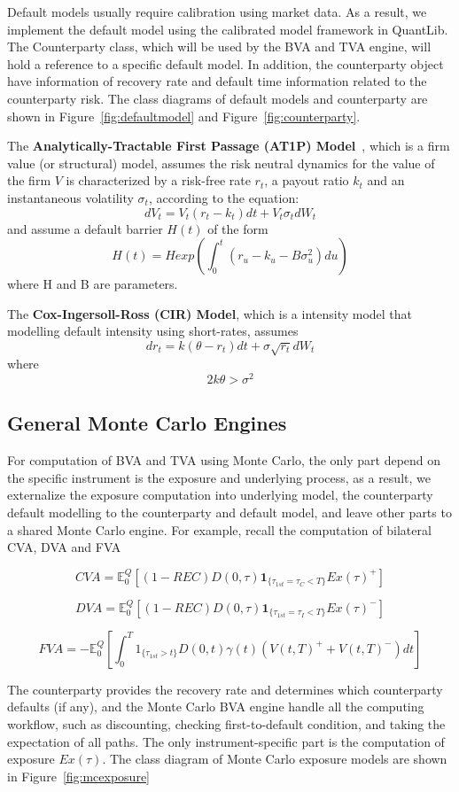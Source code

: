 Default models usually require calibration using market data. As a result, we implement the default model using the calibrated model framework in QuantLib. The Counterparty class, which will be used by the BVA and TVA engine, will hold a reference to a specific default model. In addition, the counterparty object have information of recovery rate and default time information related to the counterparty risk. The class diagrams of default models and counterparty are shown in Figure~\ref{fig:defaultmodel} and Figure~\ref{fig:counterparty}.

The \textbf{Analytically-Tractable First Passage (AT1P) Model}~\cite{brigobook}, which is a firm value (or structural) model, assumes the risk neutral dynamics for the value of the firm $V$ is characterized by a risk-free rate $r_t$, a payout ratio $k_t$ and an instantaneous volatility $\sigma_t$, according to the equation:
$$ dV_t=V_t(r_t-k_t)dt + V_t \sigma_t dW_t $$
and assume a default barrier $H(t)$ of the form 
$$H(t) = H exp(\int_0^t (r_u-k_u-B \sigma_u^2) du )$$
where H and B are parameters.

The \textbf{Cox-Ingersoll-Ross (CIR) Model}, which is a intensity model that modelling default intensity using short-rates, assumes
$$dr_t = k(\theta-r_t)dt + \sigma \sqrt{r_t} dW_t $$
where
$$2k\theta > \sigma^2 $$


\subsection{General Monte Carlo Engines}

For computation of BVA and TVA using Monte Carlo, the only part depend on the specific instrument is the exposure and underlying process, as a result, we externalize the exposure computation into underlying model, the counterparty default modelling to the counterparty and default model, and leave other parts to a shared Monte Carlo engine. For example, recall the computation of bilateral CVA, DVA and FVA

$$ CVA=\mathbb{E}_0^Q[(1-REC)D(0,\tau)\mathbf{1}_{\{\tau_{1st}=\tau_C<T\}}Ex(\tau)^+] $$

$$ DVA=\mathbb{E}_0^Q[(1-REC)D(0,\tau)\mathbf{1}_{\{\tau_{1st}=\tau_I<T\}}Ex(\tau)^-] $$

$$ FVA=-\mathbb{E}_0^Q[\int_0^T{1_{\{\tau_{1st}>t\}} D(0,t) \gamma(t)(V(t,T)^+ + V(t,T)^-)} dt]$$

The counterparty provides the recovery rate and determines which counterparty defaults (if any), and the Monte Carlo BVA engine handle all the computing workflow, such as discounting, checking first-to-default condition, and taking the expectation of all paths. The only instrument-specific part is the computation of exposure $Ex(\tau)$. The class diagram of Monte Carlo exposure models are shown in Figure~\ref{fig:mcexposure}

